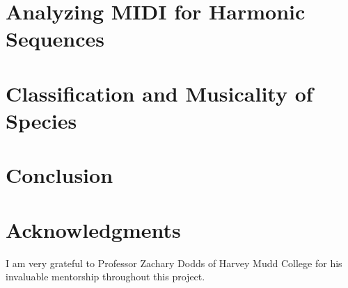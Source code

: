 \documentclass[letterpaper]{article}
\begin{document}
\section{Analyzing MIDI for Harmonic Sequences}

\section{Classification and Musicality of Species}

\section{Conclusion}



\section{Acknowledgments}

I am very grateful to Professor Zachary Dodds of Harvey Mudd College for his invaluable mentorship throughout this project.




\end{document}
